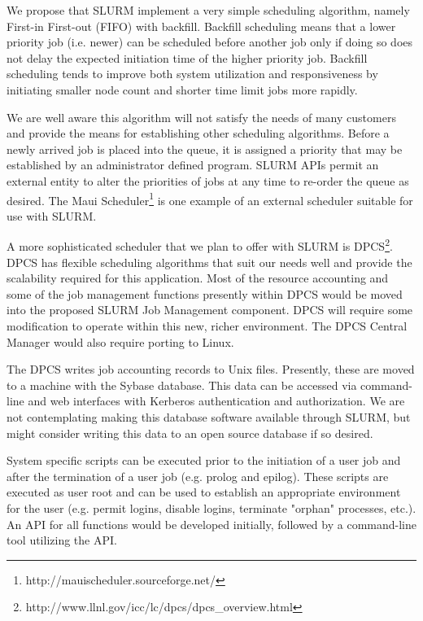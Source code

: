 We propose that SLURM implement a very simple scheduling algorithm, 
namely First-in First-out (FIFO) with backfill. Backfill scheduling 
means that a lower priority job (i.e. newer) can be scheduled before 
another job only if doing so does not delay the expected initiation 
time of the higher priority job. Backfill scheduling tends to improve 
both system utilization and responsiveness by initiating smaller 
node count and shorter time limit jobs more rapidly. 

We are well aware this algorithm will not satisfy the needs of many 
customers and provide the means for establishing other scheduling 
algorithms. Before a newly arrived job is placed into the queue, it 
is assigned a priority that may be established by an administrator 
defined program. SLURM APIs permit an external entity to alter the 
priorities of jobs at any time to re-order the queue as desired. 
The Maui Scheduler\footnote{http://mauischeduler.sourceforge.net/} 
is one example of an external scheduler suitable for use with SLURM.

A more sophisticated scheduler that we plan to offer with SLURM is 
DPCS\footnote{http://www.llnl.gov/icc/lc/dpcs/dpcs\_overview.html}. 
DPCS has flexible scheduling algorithms that suit our needs well and
provide the scalability required for this application. Most of the resource
accounting and some of the job management functions presently within DPCS would
be moved into the proposed SLURM Job Management component. 
DPCS will require some modification to operate within this new, richer
environment. The DPCS Central Manager would also require porting to Linux. 

The DPCS writes job accounting records to Unix files. Presently, these are
moved to a machine with the Sybase database. This data can be accessed via
command-line and web interfaces with Kerberos authentication and authorization.
We are not contemplating making this database software available through SLURM,
but might consider writing this data to an open source database if so desired.

System specific scripts can be executed prior to the initiation of a user job
and after the termination of a user job (e.g. prolog and epilog). 
These scripts are executed as user root and can be used to establish an 
appropriate environment for the user (e.g. permit
logins, disable logins, terminate "orphan" processes, etc.). 
An API for all functions would be developed initially, followed by a  
command-line tool utilizing the API. 

